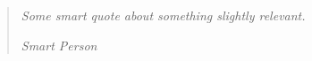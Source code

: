 \documentclass[../Main/thesis.tex]{subfiles}
\begin{document}
\chapter*{}
\null\vfill
\begin{quotation}
\em %
Some smart quote about something slightly relevant.

\em
\medskip
\raggedleft
Smart Person
\end{quotation}
\vfill\vfill
\end{document}
